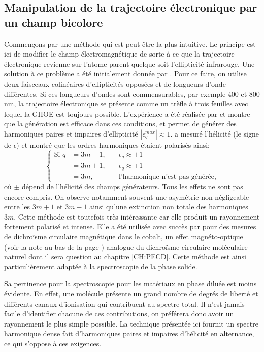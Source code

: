\subsection{Manipulation de la trajectoire électronique par un champ bicolore}
Commençons par une méthode qui est peut-être la plus intuitive. Le principe est ici de modifier le champ électromagnétique de sorte à ce que la trajectoire électronique revienne sur l'atome parent quelque soit l'ellipticité infrarouge. Une solution à ce problème a été initialement donnée par . Pour ce faire, on utilise deux faisceaux colinéaires d’ellipticités opposées et de longueurs d'onde différentes. Si ces longueurs d'ondes sont commensurables, par exemple 400 et 800 nm, la trajectoire électronique se présente comme un trèfle à trois feuilles avec lequel la GHOE est toujours possible. L'expérience a été réalisée par  et montre que la génération est efficace dans ces conditions, et permet de générer des harmoniques paires et impaires d'ellipticité $|\epsilon^{max}_q|\approx 1$.  a mesuré l'hélicité (le signe de $\epsilon$) et montré que les ordres harmoniques étaient polarisés ainsi:
\begin{equation}
\left\{
\begin{aligned}
  \text{Si }q&=3m-1,\quad &\epsilon_q \approx \pm 1 \\
	&=3m+1, &\epsilon_q \approx \mp 1 \\
	&=3m, &\text{l'harmonique n'est pas générée},
\end{aligned}
\right.
\end{equation}
où $\pm$ dépend de l'hélicité des champs générateurs. Tous les effets ne sont pas encore compris. On observe notamment souvent une asymétrie non négligeable entre les $3m+1$ et $3m-1$ ainsi qu'une extinction non totale des harmoniques $3m$.
Cette méthode est toutefois très intéressante car elle produit un rayonnement fortement polarisé et intense. Elle a été utilisée avec succès par  pour des mesures de dichroïsme circulaire magnétique dans le cobalt, un effet magnéto-optique (voir la note au bas de la page \pageref{page:noteFaraday}) analogue du dichroïsme circulaire moléculaire naturel dont il sera question au chapitre \ref{CH:PECD}. Cette méthode est ainsi particulièrement adaptée à la spectroscopie de la phase solide.\par
Sa pertinence pour la spectroscopie pour les matériaux en phase diluée est moins évidente. En effet, une molécule présente un grand nombre de degrés de liberté et différents canaux d'ionisation qui contribuent au spectre total. Il n'est jamais facile d'identifier chacune de ces contributions, on préférera donc avoir un rayonnement le plus simple possible.
La technique présentée ici fournit un spectre harmonique dense fait d'harmoniques paires et impaires d'hélicité en alternance, ce qui s'oppose à ces exigences.

